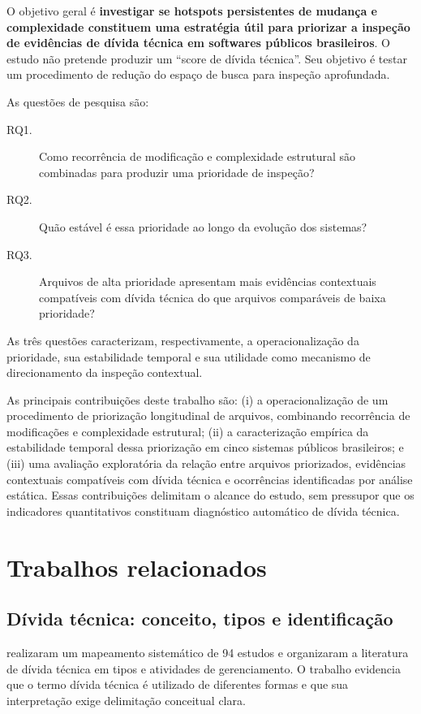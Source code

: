 \documentclass[12pt]{article}
\begin{document}
O objetivo geral é \textbf{investigar se hotspots persistentes de mudança e complexidade constituem uma estratégia útil para priorizar a inspeção de evidências de dívida técnica em softwares públicos brasileiros}. O estudo não pretende produzir um ``score de dívida técnica''. Seu objetivo é testar um procedimento de redução do espaço de busca para inspeção aprofundada.

As questões de pesquisa são:

\begin{description}
    \item[RQ1.] Como recorrência de modificação e complexidade estrutural são combinadas para produzir uma prioridade de inspeção?
    \item[RQ2.] Quão estável é essa prioridade ao longo da evolução dos sistemas?
    \item[RQ3.] Arquivos de alta prioridade apresentam mais evidências contextuais compatíveis com dívida técnica do que arquivos comparáveis de baixa prioridade?
\end{description}

As três questões caracterizam, respectivamente, a operacionalização da prioridade, sua estabilidade temporal e sua utilidade como mecanismo de direcionamento da inspeção contextual.

As principais contribuições deste trabalho são: (i) a operacionalização de um procedimento de priorização longitudinal de arquivos, combinando recorrência de modificações e complexidade estrutural; (ii) a caracterização empírica da estabilidade temporal dessa priorização em cinco sistemas públicos brasileiros; e (iii) uma avaliação exploratória da relação entre arquivos priorizados, evidências contextuais compatíveis com dívida técnica e ocorrências identificadas por análise estática. Essas contribuições delimitam o alcance do estudo, sem pressupor que os indicadores quantitativos constituam diagnóstico automático de dívida técnica.

\section{Trabalhos relacionados}

\subsection{Dívida técnica: conceito, tipos e identificação}

\cite{li2015mapping} realizaram um mapeamento sistemático de 94 estudos e organizaram a literatura de dívida técnica em tipos e atividades de gerenciamento. O trabalho evidencia que o termo dívida técnica é utilizado de diferentes formas e que sua interpretação exige delimitação conceitual clara.
\end{document}
